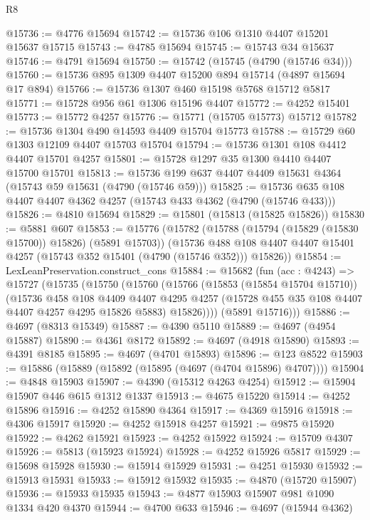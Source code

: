 \begin{lexlean}{R8}
\begin{coremodule}
@15736 := @4776 @15694
@15742 := @15736 @106 @1310 @4407 @15201 @15637 @15715
@15743 := @4785 @15694
@15745 := @15743 @34 @15637
@15746 := @4791 @15694
@15750 := @15742 (@15745 (@4790 (@15746 @34)))
@15760 := @15736 @895 @1309 @4407 @15200 @894 @15714 (@4897 @15694 @17 @894)
@15766 := @15736 @1307 @460 @15198 @5768 @15712 @5817
@15771 := @15728 @956 @61 @1306 @15196 @4407
@15772 := @4252 @15401
@15773 := @15772 @4257
@15776 := @15771 (@15705 @15773) @15712
@15782 := @15736 @1304 @490 @14593 @4409 @15704 @15773
@15788 := @15729 @60 @1303 @12109 @4407 @15703 @15704
@15794 := @15736 @1301 @108 @4412 @4407 @15701 @4257
@15801 := @15728 @1297 @35 @1300 @4410 @4407 @15700 @15701
@15813 := @15736 @199 @637 @4407 @4409 @15631 @4364 (@15743 @59 @15631 (@4790 (@15746 @59)))
@15825 := @15736 @635 @108 @4407 @4407 @4362 @4257 (@15743 @433 @4362 (@4790 (@15746 @433)))
@15826 := @4810 @15694
@15829 := @15801 (@15813 (@15825 @15826))
@15830 := @5881 @607
@15853 := @15776
    (@15782
      (@15788 (@15794 (@15829 (@15830 @15700)) @15826) (@5891 @15703))
      (@15736 @488 @108 @4407 @4407 @15401 @4257 (@15743 @352 @15401 (@4790 (@15746 @352))) @15826))
@15854 := LexLeanPreservation.construct_cons
@15884 := @15682
    (fun (acc : @4243) =>
    @15727
      (@15735
        (@15750
          (@15760
            (@15766
              (@15853 (@15854 @15704 @15710))
              (@15736
                @458
                @108
                @4409
                @4407
                @4295
                @4257
                (@15728 @455 @35 @108 @4407 @4407 @4257 @4295 @15826 @5883)
                @15826))))
        (@5891 @15716)))
@15886 := @4697 (@8313 @15349)
@15887 := @4390 @5110
@15889 := @4697 (@4954 @15887)
@15890 := @4361 @8172
@15892 := @4697 (@4918 @15890)
@15893 := @4391 @8185
@15895 := @4697 (@4701 @15893)
@15896 := @123 @8522
@15903 := @15886 (@15889 (@15892 (@15895 (@4697 (@4704 @15896) @4707))))
@15904 := @4848 @15903
@15907 := @4390 (@15312 @4263 @4254)
@15912 := @15904 @15907 @446 @615 @1312 @1337
@15913 := @4675 @15220
@15914 := @4252 @15896
@15916 := @4252 @15890 @4364
@15917 := @4369 @15916
@15918 := @4306 @15917
@15920 := @4252 @15918 @4257
@15921 := @9875 @15920
@15922 := @4262 @15921
@15923 := @4252 @15922
@15924 := @15709 @4307
@15926 := @5813 (@15923 @15924)
@15928 := @4252 @15926 @5817
@15929 := @15698 @15928
@15930 := @15914 @15929
@15931 := @4251 @15930
@15932 := @15913 @15931
@15933 := @15912 @15932
@15935 := @4870 (@15720 @15907)
@15936 := @15933 @15935
@15943 := @4877 @15903 @15907 @981 @1090 @1334 @420 @4370
@15944 := @4700 @633
@15946 := @4697 (@15944 @4362)

\end{coremodule}
\end{lexlean}
